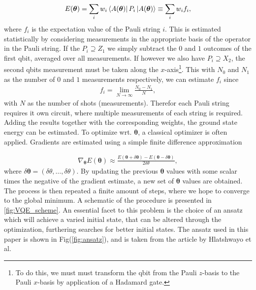 \begin{align*}
    E(\boldsymbol{\theta}) = \sum_i w_i\bra{A(\boldsymbol{\theta})} P_i \ket{A(\boldsymbol{\theta})} \equiv \sum_i w_i f_i,
\end{align*}
where $f_i$ is the expectation value of the Pauli string $i$. This is estimated statistically by considering measurements in the appropriate basis of the operator in the Pauli string. If the $P_i \supseteq Z_1$ we simply subtract the $0$ and $1$ outcomes of the first qbit, averaged over all measurements. If however we also have $P_i \supseteq X_2$, the second qbits measurement must be taken along the $x$-axis\footnote{To do this, we must must transform the qbit from the Pauli $z$-basis to the Pauli $x$-basis by application of a Hadamard gate.}. This with $N_0$ and $N_1$ as the number of $0$ and $1$ measurements respectively, we can estimate $f_i$ since 
\begin{align*}
    f_i = \lim_{N \to \infty} \frac{N_0 - N_1}{N},
\end{align*}
with $N$ as the number of shots (measurements). Therefor each Pauli string requires it own circuit, where multiple measurements of each string is required. Adding the results together with the corresponding weights, the ground state energy can be estimated. To optimize wrt. $\boldsymbol{\theta}$, a classical optimizer is often applied. Gradients are estimated using a simple finite difference approximation

\begin{align}
    \nabla_{\boldsymbol{\theta}} E(\boldsymbol{\theta}) \approx \frac{E(\boldsymbol{\theta} + \delta \boldsymbol{\theta})-E(\boldsymbol{\theta} - \delta \boldsymbol{\theta})}{2\delta \theta} ,
\end{align}
where $\delta \boldsymbol{\theta} = (\delta \theta, \ldots, \delta \theta)$. By updating the previous $\boldsymbol{\theta}$ values with some scalar times the negative of the gradient estimate, a new set of $\boldsymbol{\theta}$ values are obtained. The process is then repeated a finite amount of steps, where we hope to converge to the global minimum. A schematic of the procedure is presented in \cref{fig:VQE_scheme}. \newline An essential facet to this problem is the choice of an ansatz which will achieve a varied initial state, that can be altered through the optimization, furthering searches for better initial states. The ansatz used in this paper is shown in Fig(\ref{fig:ansatz}), and is taken from the article by Hlatshwayo et al. \cite{hlatshwayoSimulatingExcitedStates2022}

